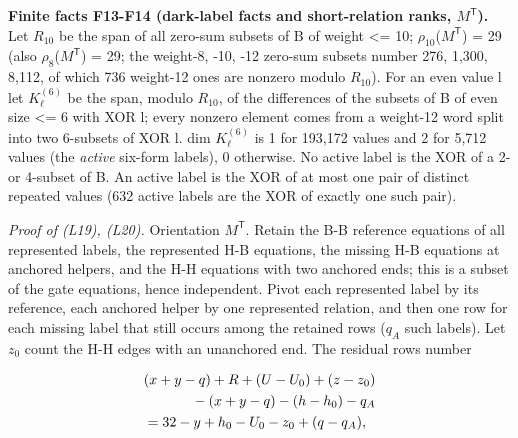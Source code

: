 \textbf{Finite facts F13-F14 (dark-label facts and short-relation ranks, \(M^{\mathsf T}\)).} Let \(R_{10}\) be the span of all zero-sum subsets of B of weight \textless= 10; \(\rho_{10}\)(\(M^{\mathsf T}\)) = 29 (also \(\rho_8\)(\(M^{\mathsf T}\)) = 29; the weight-8, -10, -12 zero-sum subsets number 276, 1,300, 8,112, of which 736 weight-12 ones are nonzero modulo \(R_{10}\)). For an even value l let \(K^{(6)}_\ell\) be the span, modulo \(R_{10}\), of the differences of the subsets of B of even size \textless= 6 with XOR l; every nonzero element comes from a weight-12 word split into two 6-subsets of XOR l. dim \(K^{(6)}_\ell\) is 1 for 193,172 values and 2 for 5,712 values (the \emph{active} six-form labels), 0 otherwise. No active label is the XOR of a 2- or 4-subset of B. An active label is the XOR of at most one pair of distinct repeated values (632 active labels are the XOR of exactly one such pair).

\emph{Proof of (L19), (L20).} Orientation \(M^{\mathsf T}\). Retain the B-B reference equations of all represented labels, the represented H-B equations, the missing H-B equations at anchored helpers, and the H-H equations with two anchored ends; this is a subset of the gate equations, hence independent. Pivot each represented label by its reference, each anchored helper by one represented relation, and then one row for each missing label that still occurs among the retained rows (\(q_A\) such labels). Let \(z_0\) count the H-H edges with an unanchored end. The residual rows number

\[
\begin{aligned}
&(x+y-q)+R+(U-U_0)+(z-z_0)\\
&\hspace{12mm}-(x+y-q)-(h-h_0)-q_A\\
&=32-y+h_0-U_0-z_0+(q-q_A),
\end{aligned}
\]

